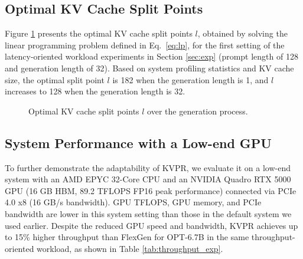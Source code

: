 \documentclass[11pt]{article}
\newcommand{\paperName}{KVPR}
\begin{document}
\subsection{Optimal KV Cache Split Points}
\label{app:optimal-split-points}

Figure \ref{app:fig:split-points} presents the optimal KV cache split points $l$, obtained by solving the linear programming problem defined in Eq.~\eqref{eq:lp}, for the first setting of the latency-oriented workload experiments in Section \ref{sec:exp} (prompt length of 128 and generation length of 32). Based on system profiling statistics and KV cache size, the optimal split point $l$ is 182 when the generation length is 1, and $l$ increases to 128 when the generation length is 32.


\begin{figure}[h]
\centering
{}
\caption{Optimal KV cache split points $l$ over the generation process.}
\label{app:fig:split-points}
\end{figure}


\subsection{System Performance with a Low-end GPU}
\label{app:low-end-gpu-experiments}

To further demonstrate the adaptability of {\paperName}, we evaluate it on a low-end system with an AMD EPYC 32-Core CPU and an NVIDIA Quadro RTX 5000 GPU (16 GB HBM, 89.2 TFLOPS FP16 peak performance) connected via PCIe 4.0 x8 (16 GB/s bandwidth). GPU TFLOPS, GPU memory, and PCIe bandwidth are lower in this system setting than those in the default system we used earlier. Despite the reduced GPU speed and bandwidth, {\paperName} achieves up to 15\% higher throughput than FlexGen for OPT-6.7B in the same throughput-oriented workload, as shown in Table \ref{tab:throughput_exp}. 
\end{document}
